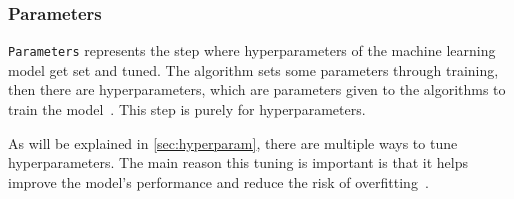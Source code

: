 \subsubsection{Parameters}\label{subsubsec:machine-learning-pipeline-parameters}
\texttt{Parameters} represents the step where hyperparameters of the machine learning model get set and tuned. The algorithm sets some parameters through training, then there are hyperparameters, which are parameters given to the algorithms to train the model~\cite{what-is-hyperparameter-tuning}. This step is purely for hyperparameters.

As will be explained in \autoref{sec:hyperparam}, there are multiple ways to tune hyperparameters. The main reason this tuning is important is that it helps improve the model's performance and reduce the risk of overfitting~\cite{hyperparameter-tuning}.
